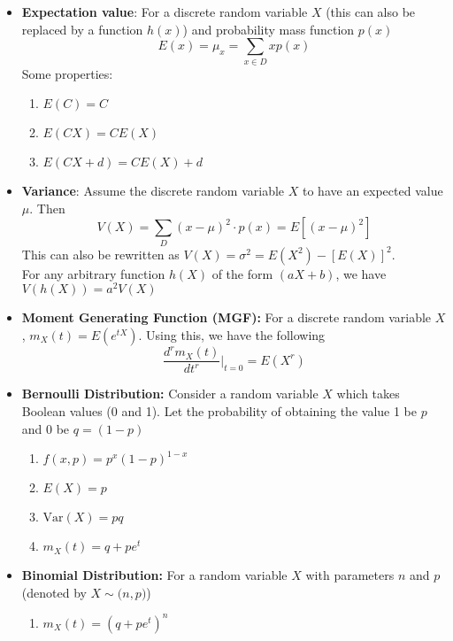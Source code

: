 \documentclass[a4paper]{article}
\begin{document}
\begin{itemize}
    \item \textbf{Expectation value}: For a discrete random variable $X$ (this can also be replaced by a function $h(x)$) and probability mass function $p(x)$
    \begin{equation*}
        E(x) = \mu_x = \sum_{x\in D}xp(x)
    \end{equation*}
    Some properties:
    \begin{enumerate}
        \item $E(C) = C$
        \item $E(CX) = CE(X)$
        \item $E(CX+d) = CE(X) + d$
    \end{enumerate}
    \item \textbf{Variance}: Assume the discrete random variable $X$ to have an expected value $\mu$. Then
    \begin{equation*}
        V(X) = \sum_{D}^{}(x-\mu)^2\cdot p(x) = E[(x-\mu)^2]
    \end{equation*}
    This can also be rewritten as $V(X) = \sigma^2 = E(X^2)- [E(X)]^2$.\\
    For any arbitrary function $h(X)$ of the form $(aX+b)$, we have $V(h(X)) = a^2V(X)$
    \item \textbf{Moment Generating Function (MGF): }For a discrete random variable $X$, $m_X(t) = E(e^{tX})$. Using this, we have the following
    \begin{equation*}
        \frac{d^rm_X(t)}{dt^r}\biggr\rvert_{t = 0} = E(X^r)
    \end{equation*}
    \item \textbf{Bernoulli Distribution: } Consider a random variable $X$ which takes Boolean values (0 and 1). Let the probability of obtaining the value 1 be $p$ and $0$ be $q = (1-p)$ 
    \begin{enumerate}
        \item $f(x, p) = p^x(1-p)^{1-x}$
        \item $E(X) = p$
        \item $\text{Var}(X) = pq$
        \item $m_X(t) = q+pe^t$
    \end{enumerate}
    \item \textbf{Binomial Distribution: } For a random variable $X$ with parameters $n$ and $p$ (denoted by $X\sim\mathcal(n,p)$)
    \begin{enumerate}
        \item $m_X(t) = (q+pe^t)^n$

\end{enumerate}
\end{itemize}
\end{document}

